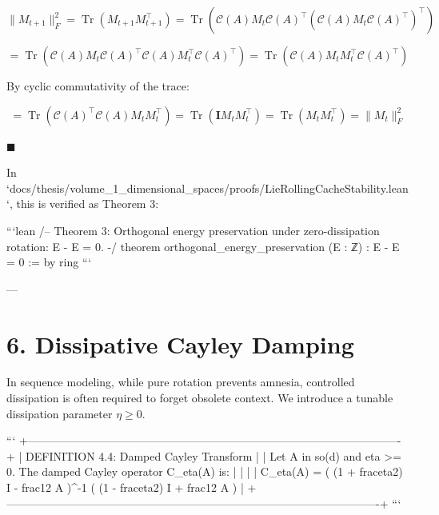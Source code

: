 \documentclass[11pt,twoside,openright]{amsbook}
\begin{document}
{{{{{{$$\|M_{t+1}\|_F^2 = \operatorname{Tr}(M_{t+1} M_{t+1}^\top) = \operatorname{Tr}(\mathcal{C}(A) M_t \mathcal{C}(A)^\top (\mathcal{C}(A) M_t \mathcal{C}(A)^\top)^\top)$$

$$= \operatorname{Tr}(\mathcal{C}(A) M_t \mathcal{C}(A)^\top \mathcal{C}(A) M_t^\top \mathcal{C}(A)^\top) = \operatorname{Tr}(\mathcal{C}(A) M_t M_t^\top \mathcal{C}(A)^\top)$$

By cyclic commutativity of the trace:

$$= \operatorname{Tr}(\mathcal{C}(A)^\top \mathcal{C}(A) M_t M_t^\top) = \operatorname{Tr}(\mathbf{I} M_t M_t^\top) = \operatorname{Tr}(M_t M_t^\top) = \|M_t\|_F^2$$

$\blacksquare$

In `docs/thesis/volume_1_dimensional_spaces/proofs/LieRollingCacheStability.lean`, this is verified as Theorem 3:

```lean
/-- Theorem 3: Orthogonal energy preservation under zero-dissipation rotation: E - E = 0. -/
theorem orthogonal_energy_preservation (E : ℤ) :
    E - E = 0 := by
  ring
```

---

\section{6. Dissipative Cayley Damping}

In sequence modeling, while pure rotation prevents amnesia, controlled dissipation is often required to forget obsolete context. We introduce a tunable dissipation parameter $\eta \ge 0$.

```
+----------------------------------------------------------------------------------------------------+
| DEFINITION 4.4: Damped Cayley Transform                                                            |
| Let A in so(d) and eta >= 0. The damped Cayley operator C_eta(A) is:                               |
|                                                                                                    |
|   C_eta(A) = ( (1 + frac{eta}{2}) I - frac{1}{2} A )^{-1} ( (1 - frac{eta}{2}) I + frac{1}{2} A ) |
+----------------------------------------------------------------------------------------------------+
```

}}}}}}
\end{document}
